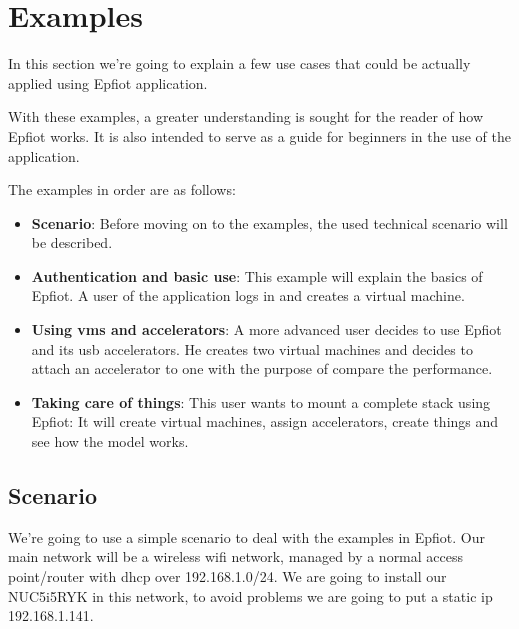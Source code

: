 
\cleardoublepage


\chapter{Examples}
\label{makereference6}

In this section we're going to explain a few use cases that could be actually applied using Epfiot application.

With these examples, a greater understanding is sought for the reader of how Epfiot works. It is also intended to serve as a guide for beginners in the use of the application.


The examples in order are as follows:
\begin{itemize}
    \item \textbf{Scenario}: Before moving on to the examples, the used technical scenario will be described.
    \item \textbf{Authentication and basic use}: This example will explain the basics of Epfiot. A user of the application logs in and creates a virtual machine.
    \item \textbf{Using vms and accelerators}: A more advanced user decides to use Epfiot and its usb accelerators. He creates two virtual machines and decides to attach an accelerator to one with the purpose of compare the performance.
    \item \textbf{Taking care of things}: This user wants to mount a complete stack using Epfiot: It will create virtual machines, assign accelerators, create things and see how the model works.
\end{itemize}

\newpage
\section{Scenario}
\label{makereference6.1}

We're going to use a simple scenario to deal with the examples in Epfiot.
Our main network will be a wireless wifi network, managed by a normal access point/router with dhcp over 192.168.1.0/24. We are going to install our NUC5i5RYK in this network, to avoid problems we are going to put a static ip 192.168.1.141.

